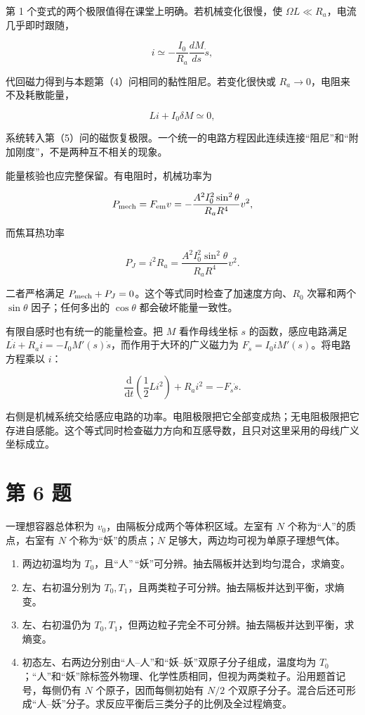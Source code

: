 \documentclass[12pt,a4paper,UTF8]{ctexart}
\newcommand{\tightlist}{\setlength{\itemsep}{0pt}\setlength{\parskip}{0pt}}
\begin{document}
第 1 个变式的两个极限值得在课堂上明确。若机械变化很慢，使
\(\Omega L\ll R_a\)，电流几乎即时跟随，

\[i\simeq-\frac{I_0}{R_a}\frac{dM}{ds}\dot s,\]

代回磁力得到与本题第（4）问相同的黏性阻尼。若变化很快或
\(R_a\to0\)，电阻来不及耗散能量，

\[Li+I_0\delta M\simeq0,\]

系统转入第（5）问的磁恢复极限。一个统一的电路方程因此连续连接``阻尼''和``附加刚度''，不是两种互不相关的现象。

能量核验也应完整保留。有电阻时，机械功率为

\[P_{\rm mech}=F_{\rm em}v
=-\frac{A^2I_0^2\sin^2\theta}{R_aR^4}v^2,\]

而焦耳热功率

\[P_J=i^2R_a
=\frac{A^2I_0^2\sin^2\theta}{R_aR^4}v^2.\]

二者严格满足
\(P_{\rm mech}+P_J=0\)。这个等式同时检查了加速度方向、\(R_0\) 次幂和两个
\(\sin\theta\) 因子；任何多出的 \(\cos\theta\) 都会破坏能量一致性。

有限自感时也有统一的能量检查。把 \(M\) 看作母线坐标 \(s\)
的函数，感应电路满足
\(L\dot i+R_ai=-I_0M'(s)\dot s\)，而作用于大环的广义磁力为
\(F_s=I_0iM'(s)\)。将电路方程乘以 \(i\)：

\[\frac{\mathrm d}{\mathrm dt}\left(\frac12Li^2\right)
+R_ai^2=-F_s\dot s.\]

右侧是机械系统交给感应电路的功率。电阻极限把它全部变成热；无电阻极限把它存进自感能。这个等式同时检查磁力方向和互感导数，且只对这里采用的母线广义坐标成立。

\newpage

\section{第 6 题}\label{ux7b2c-6-ux9898}

一理想容器总体积为 \(v_0\)，由隔板分成两个等体积区域。左室有 \(N\)
个称为``人''的质点，右室有 \(N\) 个称为``妖''的质点；\(N\)
足够大，两边均可视为单原子理想气体。

\begin{enumerate}
\def\labelenumi{\arabic{enumi}.}
\tightlist
\item
  两边初温均为
  \(T_0\)，且``人''\,``妖''可分辨。抽去隔板并达到均匀混合，求熵变。
\item
  左、右初温分别为
  \(T_0,T_1\)，且两类粒子可分辨。抽去隔板并达到平衡，求熵变。
\item
  左、右初温仍为
  \(T_0,T_1\)，但两边粒子完全不可分辨。抽去隔板并达到平衡，求熵变。
\item
  初态左、右两边分别由``人--人''和``妖--妖''双原子分子组成，温度均为
  \(T_0\)；``人''和``妖''除标签外物理、化学性质相同，但视为两类粒子。沿用题首记号，每侧仍有
  \(N\) 个原子，因而每侧初始有 \(N/2\)
  个双原子分子。混合后还可形成``人--妖''分子。求反应平衡后三类分子的比例及全过程熵变。
\end{enumerate}
\end{document}
